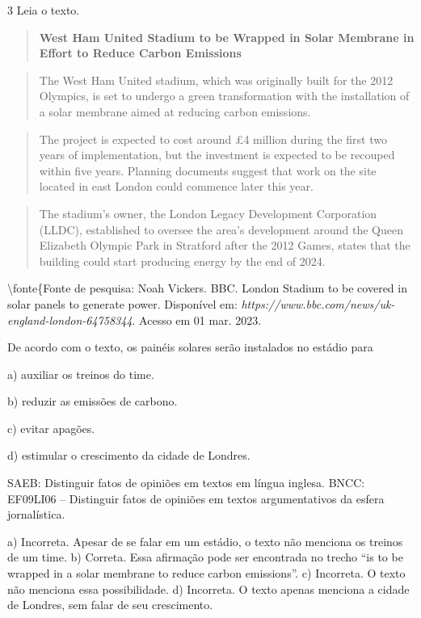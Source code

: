 \num{3} Leia o texto.

\begin{quote}
\textbf{West Ham United Stadium to be Wrapped in Solar Membrane in
Effort to Reduce Carbon Emissions}
\end{quote}

\begin{quote}
The West Ham United stadium, which was originally built for the 2012
Olympics, is set to undergo a green transformation with the installation
of a solar membrane aimed at reducing carbon emissions.
\end{quote}

\begin{quote}
The project is expected to cost around £4 million during the first two
years of implementation, but the investment is expected to be recouped
within five years. Planning documents suggest that work on the site
located in east London could commence later this year.
\end{quote}

\begin{quote}
The stadium's owner, the London Legacy Development Corporation (LLDC),
established to oversee the area's development around the Queen Elizabeth
Olympic Park in Stratford after the 2012 Games, states that the building
could start producing energy by the end of 2024.
\end{quote}

\textbackslash{}fonte\{Fonte de pesquisa: Noah Vickers. BBC. London
Stadium to be covered in solar panels to generate power. Disponível em:
\emph{https://www.bbc.com/news/uk-england-london-64758344}. Acesso em 01
mar. 2023.

De acordo com o texto, os painéis solares serão instalados no estádio
para

a) auxiliar os treinos do time.

b) reduzir as emissões de carbono.

c) evitar apagões.

d) estimular o crescimento da cidade de Londres.

SAEB: Distinguir fatos de opiniões em textos em língua inglesa. BNCC:
EF09LI06 -- Distinguir fatos de opiniões em textos argumentativos da
esfera jornalística.

a) Incorreta. Apesar de se falar em um estádio, o texto não menciona os
treinos de um time. b) Correta. Essa afirmação pode ser encontrada no
trecho ``is to be wrapped in a solar membrane to reduce carbon
emissions''. c) Incorreta. O texto não menciona essa possibilidade. d)
Incorreta. O texto apenas menciona a cidade de Londres, sem falar de seu
crescimento.

